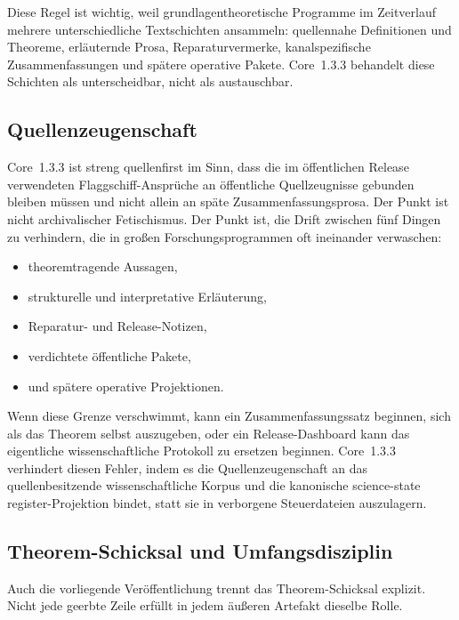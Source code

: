 Diese Regel ist wichtig, weil grundlagentheoretische Programme im Zeitverlauf
mehrere unterschiedliche Textschichten ansammeln: quellennahe Definitionen und
Theoreme, erläuternde Prosa, Reparaturvermerke, kanalspezifische
Zusammenfassungen und spätere operative Pakete. Core~1.3.3 behandelt diese
Schichten als unterscheidbar, nicht als austauschbar.

\subsection{Quellenzeugenschaft}

Core~1.3.3 ist streng quellenfirst im Sinn, dass die im öffentlichen Release
verwendeten Flaggschiff-Ansprüche an öffentliche Quellzeugnisse gebunden
bleiben müssen und nicht allein an späte Zusammenfassungsprosa. Der Punkt ist
nicht archivalischer Fetischismus. Der Punkt ist, die Drift zwischen fünf
Dingen zu verhindern, die in großen Forschungsprogrammen oft ineinander
verwaschen:

\begin{itemize}
\item theoremtragende Aussagen,
\item strukturelle und interpretative Erläuterung,
\item Reparatur- und Release-Notizen,
\item verdichtete öffentliche Pakete,
\item und spätere operative Projektionen.
\end{itemize}

Wenn diese Grenze verschwimmt, kann ein Zusammenfassungssatz beginnen, sich als
das Theorem selbst auszugeben, oder ein Release-Dashboard kann das eigentliche
wissenschaftliche Protokoll zu ersetzen beginnen. Core~1.3.3 verhindert diesen
Fehler, indem es die Quellenzeugenschaft an das quellenbesitzende
wissenschaftliche Korpus und die kanonische science-state register-Projektion bindet, statt sie
in verborgene Steuerdateien auszulagern.

\subsection{Theorem-Schicksal und Umfangsdisziplin}

Auch die vorliegende Veröffentlichung trennt das Theorem-Schicksal explizit.
Nicht jede geerbte Zeile erfüllt in jedem äußeren Artefakt dieselbe Rolle.

